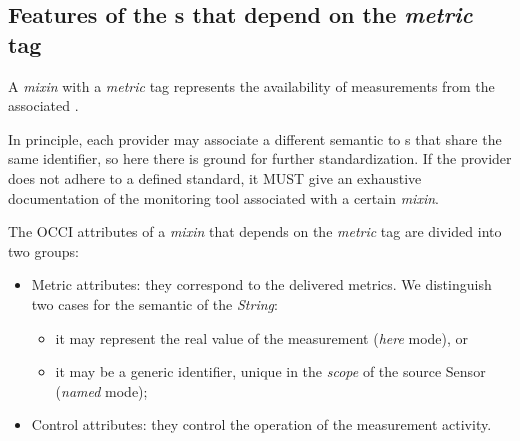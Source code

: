 \documentclass[10pt,a4paper]{article}
\begin{document}
\subsection{Features of the \mi s that depend on the {\em metric} tag \label{sec:Tool}}

A {\em mixin} with a {\em metric} tag represents the availability of measurements from the associated \coll.

\newcommand{\misem}[1]{In principle, each provider may associate a different semantic to \mi s that share the same identifier, so here there is ground for further standardization. If the provider does not adhere to a defined standard, it MUST give an exhaustive documentation of #1 associated with a certain {\em mixin}.}

\misem{the monitoring tool}

The OCCI attributes of a {\em mixin} that depends on the {\em metric} tag are divided into two groups:
\begin{itemize}

\item Metric attributes: they correspond to the delivered metrics. We distinguish two cases for the semantic of the {\em String}:
\begin{itemize}
\item it may represent the real value of the measurement ({\em here} mode), or
\item it may be a generic identifier, unique in the {\em scope} of the source Sensor ({\em named} mode);
\end{itemize}


\item Control attributes: they control the operation of the measurement activity.

\end{itemize}
\end{document}
